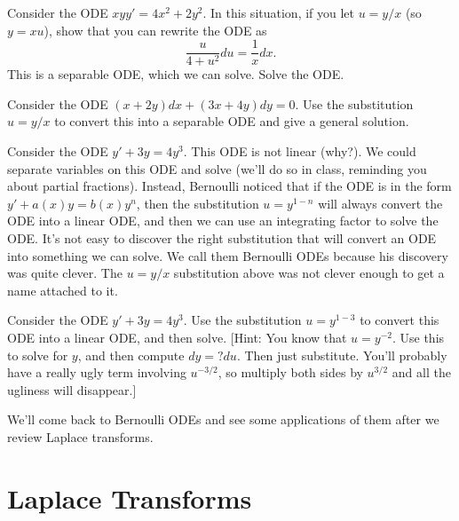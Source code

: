 \begin{problem}
 Consider the ODE $xy y' = 4x^2+2y^2$.  
In this situation, if you let $u=y/x$ (so $y=xu$), show that you can rewrite the ODE as 
$$\frac{u}{4+u^2}du = \frac{1}{x}dx.$$  This is a separable ODE, which we can solve.  Solve the ODE.
\end{problem}

\begin{problem}
 Consider the ODE $(x+2y)dx+(3x+4y)dy=0$.  Use the substitution $u=y/x$ to convert this into a separable ODE and give a general solution. 
\end{problem}

 Consider the ODE $y'+3y=4y^3$. This ODE is not linear (why?).  We could separate variables on this ODE and solve (we'll do so in class, reminding you about partial fractions). Instead, Bernoulli noticed that if the ODE is in the form $y'+a(x)y=b(x)y^n$, then the substitution $u = y^{1-n}$ will always convert the ODE into a linear ODE, and then we can use an integrating factor to solve the ODE. It's not easy to discover the right substitution that will convert an ODE into something we can solve.  We call them Bernoulli ODEs because his discovery was quite clever.  The $u=y/x$ substitution above was not clever enough to get a name attached to it.

\begin{problem}
 Consider the ODE $y'+3y=4y^3$.  Use the substitution $u=y^{1-3}$ to convert this ODE into a linear ODE, and then solve.  
 [Hint:  You know that $u=y^{-2}$.  Use this to solve for $y$, and then compute $dy = ? du$.  Then just substitute. You'll probably have a really ugly term involving $u^{-3/2}$, so multiply both sides by $u^{3/2}$ and all the ugliness will disappear.]
\end{problem}

We'll come back to Bernoulli ODEs and see some applications of them after we review Laplace transforms.


\section{Laplace Transforms}



